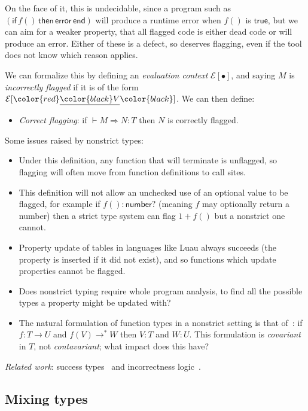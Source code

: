 \documentclass[acmsmall]{acmart}
\newcommand{\squnder}[1]{\color{red}\underline{{\color{black}#1}}\color{black}}
\newcommand{\evCtx}{\mathcal{E}}
\newcommand{\TRUE}{\mathsf{true}}
\newcommand{\NUMBER}{\mathsf{number}}
\newcommand{\ERROR}{\mathsf{error}}
\newcommand{\IF}{\mathsf{if}\,}
\newcommand{\THEN}{\,\mathsf{then}\,}
\newcommand{\END}{\,\mathsf{end}}
\begin{document}
On the face of it, this is undecidable, since a program such as
$(\IF f() \THEN \ERROR \END)$ will produce a runtime error when $f()$ is
$\TRUE$, but we can aim for a weaker property, that all flagged code
is either dead code or will produce an error. Either of these is a
defect, so deserves flagging, even if the tool does not know
which reason applies.

We can formalize this by defining an \emph{evaluation context}
$\evCtx[\bullet]$, and saying $M$ is \emph{incorrectly flagged}
if it is of the form $\evCtx[\squnder{V}]$. We can then define:
\begin{itemize}
\item \emph{Correct flagging}: if ${} \vdash M \Rightarrow N : T$
  then $N$ is correctly flagged.
\end{itemize}
Some issues raised by nonstrict types:
\begin{itemize}

\item Under this definition, any function that will terminate is unflagged, so
  flagging will often move from function definitions to call sites.

\item This definition will not allow an unchecked use of an optional value
  to be flagged, for example if $f() : \NUMBER?$ (meaning $f$ may optionally return a number)
  then a strict type system can flag $1 + f()$ but a nonstrict one cannot.

\item Property update of tables in languages like Luau always succeeds
  (the property is inserted if it did not exist), and so functions which
  update properties cannot be flagged.

\item Does nonstrict typing require whole program analysis,
  to find all the possible types a property might be updated with?

\item The natural formulation of function types in a nonstrict setting
  is that of~\cite{???}: if $f: T \rightarrow U$ and $f(V) \rightarrow^* W$
  then $V:T$ and $W:U$. This formulation is \emph{covariant} in $T$,
  not \emph{contavariant}; what impact does this have?
  
\end{itemize}
\emph{Related work}: success types~\cite{SuccessTyping} and incorrectness logic~\cite{IncorrectnessLogic}.

\subsection{Mixing types}
\end{document}
